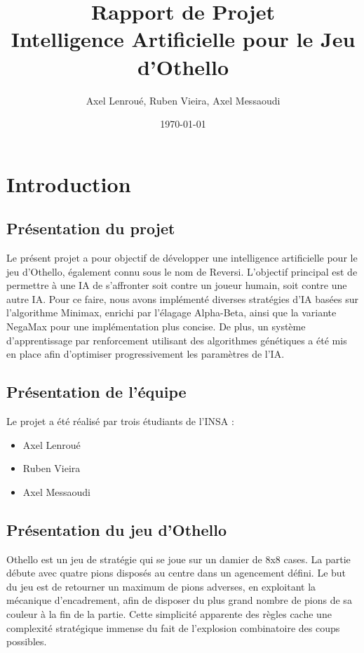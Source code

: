 \documentclass[a4paper,12pt]{article}
\title{Rapport de Projet\\Intelligence Artificielle pour le Jeu d'Othello}
\author{Axel Lenroué, Ruben Vieira, Axel Messaoudi}
\date{\today}
\begin{document}
\maketitle

\begin{abstract}
\end{abstract}

\tableofcontents

\section{Introduction}

\subsection{Présentation du projet}
Le présent projet a pour objectif de développer une intelligence artificielle pour le jeu d'Othello, également connu sous le nom de Reversi. L’objectif principal est de permettre à une IA de s'affronter soit contre un joueur humain, soit contre une autre IA. Pour ce faire, nous avons implémenté diverses stratégies d’IA basées sur l’algorithme Minimax, enrichi par l’élagage Alpha-Beta, ainsi que la variante NegaMax pour une implémentation plus concise. De plus, un système d’apprentissage par renforcement utilisant des algorithmes génétiques a été mis en place afin d’optimiser progressivement les paramètres de l’IA.

\subsection{Présentation de l'équipe}
Le projet a été réalisé par trois étudiants de l'INSA :
\begin{itemize}
  \item Axel Lenroué
  \item Ruben Vieira
  \item Axel Messaoudi
\end{itemize}

\subsection{Présentation du jeu d'Othello}
Othello est un jeu de stratégie qui se joue sur un damier de 8x8 cases. La partie débute avec quatre pions disposés au centre dans un agencement défini. Le but du jeu est de retourner un maximum de pions adverses, en exploitant la mécanique d'encadrement, afin de disposer du plus grand nombre de pions de sa couleur à la fin de la partie. Cette simplicité apparente des règles cache une complexité stratégique immense du fait de l’explosion combinatoire des coups possibles.
\end{document}
